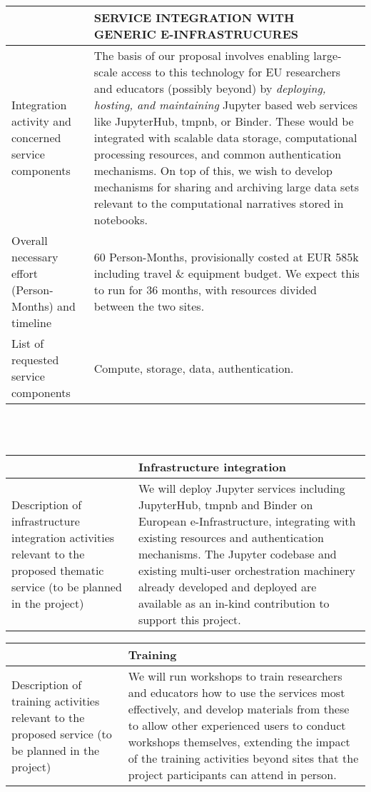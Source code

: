 \begin{tabular}{|p{7cm}|p{7cm}|}
&SERVICE INTEGRATION WITH GENERIC E-INFRASTRUCURES
\\\hline
Integration activity and concerned service components&The basis of our proposal involves
enabling large-scale access to this technology for EU researchers and educators
(possibly beyond) by \emph{deploying, hosting, and maintaining} Jupyter
based web services like JupyterHub, tmpnb, or Binder. These would be integrated
with scalable data storage, computational processing resources, and common
authentication mechanisms. On top of this, we wish to develop mechanisms for sharing
and archiving large data sets relevant to the computational narratives stored in
notebooks.
\\\hline
Overall necessary effort (Person-Months) and timeline&60 Person-Months,
provisionally costed at EUR 585k including travel \& equipment budget.
We expect this to run for 36 months, with resources divided between the two
sites.
\\\hline
List of requested service components&Compute, storage, data, authentication.
\\\hline
\end{tabular}
\\\\
\begin{tabular}{|p{7cm}|p{7cm}|}
&Infrastructure integration
\\\hline
Description of infrastructure integration activities relevant to the proposed
thematic service (to be planned in the project)&
We will deploy Jupyter services including JupyterHub, tmpnb and Binder on European
e-Infrastructure, integrating with existing resources and authentication
mechanisms. The Jupyter codebase and existing multi-user orchestration machinery
already developed and deployed are available as an in-kind contribution to
support this project.
\\\hline
\end{tabular}

\begin{tabular}{|p{7cm}|p{7cm}|}
&Training
\\\hline
Description of training activities relevant to the proposed service (to be planned in the project)&
We will run workshops to train researchers and educators how to use the services
most effectively, and develop materials from these to allow other experienced
users to conduct workshops themselves, extending the impact of the training
activities beyond sites that the project participants can attend in person.
\\\hline
\end{tabular}

